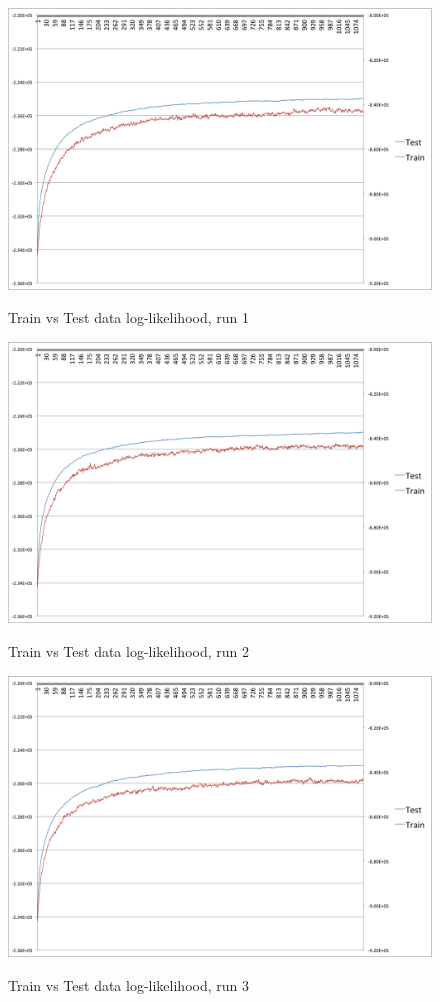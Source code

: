 \documentclass[12pt, letterpaper]{article}
\begin{document}
\begin{enumerate}[1.]
        \begin{figure}[ht]
            \caption{Train vs Test data log-likelihood, run 1}
            \includegraphics[scale=0.5]{ml_graph_1a}\\
        \end{figure}
        \begin{figure}[ht]
            \caption{Train vs Test data log-likelihood, run 2}
            \includegraphics[scale=0.5]{ml_graph_1b}\\
        \end{figure}
        \begin{figure}[ht]
            \caption{Train vs Test data log-likelihood, run 3}
            \includegraphics[scale=0.5]{ml_graph_1c}\\

\end{figure}
\end{enumerate}
\end{document}
